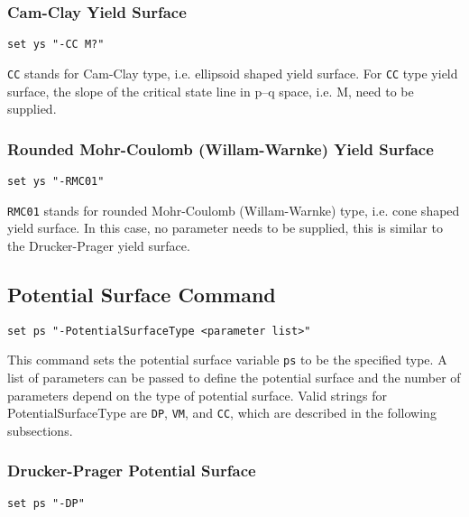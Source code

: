 \subsubsection{Cam-Clay Yield Surface} 
\label{cc_ys}
\begin{verbatim}
set ys "-CC M?"
\end{verbatim}

\texttt{CC}  stands  for  Cam-Clay  type, i.e. ellipsoid shaped
yield surface. For \texttt{CC} type yield surface, the slope of
the  critical  state  line  in  p--q  space, i.e. M, need to be
supplied.

\subsubsection{Rounded Mohr-Coulomb (Willam-Warnke) Yield Surface} 
\label{rmc01_ys}
\begin{verbatim}
set ys "-RMC01"
\end{verbatim}

\texttt{RMC01} stands for rounded Mohr-Coulomb (Willam-Warnke) type, 
i.e. cone shaped
yield  surface. In this case, no parameter needs to be supplied, 
this is similar to the Drucker-Prager yield surface.

\subsection{Potential Surface Command}
\label{PS_Command}

\begin{verbatim}
set ps "-PotentialSurfaceType <parameter list>"
\end{verbatim}

This command sets the potential surface variable \texttt{ps} to
be  the  specified  type. A list of parameters can be passed to
define  the  potential  surface  and  the  number of parameters
depend  on  the  type  of  potential surface. Valid strings for
PotentialSurfaceType    are   \texttt{DP},   \texttt{VM},   and
\texttt{CC}, which are described in the following subsections.

\subsubsection{Drucker-Prager Potential Surface} 
\label{dp_ps}
\begin{verbatim}
set ps "-DP"
\end{verbatim}

